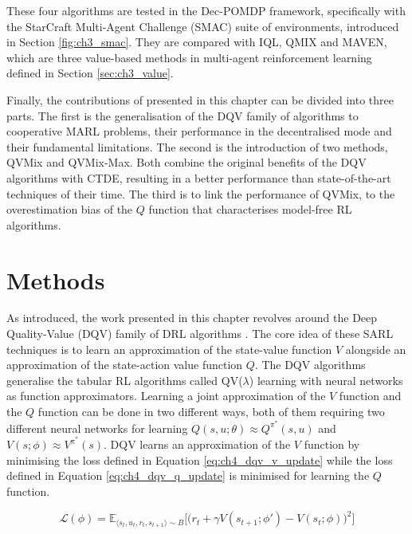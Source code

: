 These four algorithms are tested in the Dec-POMDP framework, specifically with the StarCraft Multi-Agent Challenge (SMAC) suite of environments, introduced in Section \ref{fig:ch3_smac}.
They are compared with IQL, QMIX and MAVEN, which are three value-based methods in multi-agent reinforcement learning defined in Section \ref{sec:ch3_value}.

Finally, the contributions of \citep{leroy2020qvmix} presented in this chapter can be divided into three parts.
The first is the generalisation of the DQV family of algorithms to cooperative MARL problems, their performance in the decentralised mode and their fundamental limitations.
The second is the introduction of two methods, QVMix and QVMix-Max.
Both combine the original benefits of the DQV algorithms with CTDE, resulting in a better performance than state-of-the-art techniques of their time.
The third is to link the performance of QVMix, to the overestimation bias of the $Q$ function that characterises model-free RL algorithms.

\section{Methods} \label{sec:ch4_methods} 

As introduced, the work presented in this chapter revolves around the Deep Quality-Value (DQV) family of DRL algorithms \cite{sabatelli2018deepQV, sabatelli2020deep}.
The core idea of these SARL techniques is to learn an approximation of the state-value function $V$ alongside an approximation of the state-action value function $Q$.
The DQV algorithms generalise the tabular RL algorithms called QV($\lambda$) learning \citep{wiering2005qv, wiering2009qv} with neural networks as function approximators.
Learning a joint approximation of the $V$ function and the $Q$ function can be done in two different ways, both of them requiring two different neural networks for learning $Q(s, u;\theta)\approx Q^{\pi^*}(s, u)$ and $V(s;\phi)\approx V^{\pi^*}(s)$.
DQV learns an approximation of the $V$ function by minimising the loss defined in Equation \ref{eq:ch4_dqv_v_update} while the loss defined in Equation \ref{eq:ch4_dqv_q_update} is minimised for learning the $Q$ function.

\begin{equation}
    \mathcal{L}(\phi) = \mathbb{E}_{\langle s_{t}, u_{t},r_{t},s_{t+1}\rangle\sim B} \bigg[\big(r_{t} + \gamma V(s_{t+1}; \phi') - V(s_{t}; \phi)\big)^{2}\bigg]
    \label{eq:ch4_dqv_v_update}
\end{equation}
    

